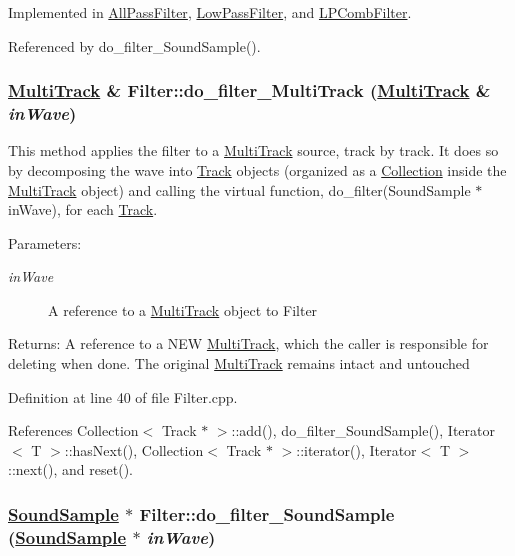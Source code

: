 Implemented in \hyperlink{classAllPassFilter_a2}{All\-Pass\-Filter}, \hyperlink{classLowPassFilter_a2}{Low\-Pass\-Filter}, and \hyperlink{classLPCombFilter_a2}{LPComb\-Filter}.

Referenced by do\_\-filter\_\-Sound\-Sample().\hypertarget{classFilter_a0}{
\subsubsection[do\_\-filter\_\-MultiTrack]{\setlength{\rightskip}{0pt plus 5cm}\hyperlink{classMultiTrack}{Multi\-Track} \& Filter::do\_\-filter\_\-Multi\-Track (\hyperlink{classMultiTrack}{Multi\-Track} \& {\em in\-Wave})}}
\label{classFilter_a0}


This method applies the filter to a \hyperlink{classMultiTrack}{Multi\-Track} source, track by track. It does so by decomposing the wave into \hyperlink{classTrack}{Track} objects (organized as a \hyperlink{classCollection}{Collection} inside the \hyperlink{classMultiTrack}{Multi\-Track} object) and calling the virtual function, do\_\-filter(Sound\-Sample $\ast$in\-Wave), for each \hyperlink{classTrack}{Track}.

\begin{Desc}
\item[Parameters:]
\begin{description}
\item[{\em in\-Wave}]A reference to a \hyperlink{classMultiTrack}{Multi\-Track} object to Filter\end{description}
\end{Desc}
\begin{Desc}
\item[Returns:]A reference to a NEW \hyperlink{classMultiTrack}{Multi\-Track}, which the caller is responsible for deleting when done. The original \hyperlink{classMultiTrack}{Multi\-Track} remains intact and untouched \end{Desc}


Definition at line 40 of file Filter.cpp.

References Collection$<$ Track $\ast$ $>$::add(), do\_\-filter\_\-Sound\-Sample(), Iterator$<$ T $>$::has\-Next(), Collection$<$ Track $\ast$ $>$::iterator(), Iterator$<$ T $>$::next(), and reset().\hypertarget{classFilter_a2}{
\subsubsection[do\_\-filter\_\-SoundSample]{\setlength{\rightskip}{0pt plus 5cm}\hyperlink{classSoundSample}{Sound\-Sample} $\ast$ Filter::do\_\-filter\_\-Sound\-Sample (\hyperlink{classSoundSample}{Sound\-Sample} $\ast$ {\em in\-Wave})}}
\label{classFilter_a2}



